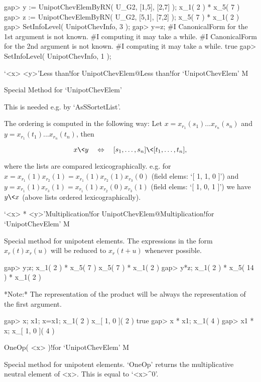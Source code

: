 \beginexample
gap> y := UnipotChevElemByRN( U_G2, [1,5], [2,7] );
x_{1}( 2 ) * x_{5}( 7 )
gap> z := UnipotChevElemByRN( U_G2, [5,1], [7,2] );
x_{5}( 7 ) * x_{1}( 2 )
gap> SetInfoLevel( UnipotChevInfo, 3 );
gap> y=z;
#I  CanonicalForm for the 1st argument is not known.
#I                    computing it may take a while.
#I  CanonicalForm for the 2nd argument is not known.
#I                    computing it may take a while.
true
gap> SetInfoLevel( UnipotChevInfo, 1 );
\endexample

\>`<x> \< <y>'{Less than!for UnipotChevElem}@{Less than!for `UnipotChevElem'} M
\indextt{\\\<}

Special Method for `UnipotChevElem'

This is needed e.g. by `AsSSortetList'.

The ordering is computed in the following way:
Let    $x = x_{r_1}(s_1) ... x_{r_n}(s_n)$
and    $y = x_{r_1}(t_1) ... x_{r_n}(t_n)$, then

$$ x \< y \quad  \Leftrightarrow \quad [ s_1, \dots, s_n ] \< [ t_1, \dots, t_n ], $$

where the lists are compared lexicographically.
e.g. for $x = x_{r_1}(1)x_{r_2}(1) = x_{r_1}(1)x_{r_2}(1)x_{r_3}(0)$  (field elems: `[ 1, 1, 0 ]')
     and $y = x_{r_1}(1)x_{r_3}(1) = x_{r_1}(1)x_{r_2}(0)x_{r_3}(1)$  (field elems: `[ 1, 0, 1 ]')
we have $y \< x$ (above lists ordered lexicographically).

\>`<x> * <y>'{Multiplication!for UnipotChevElem}@{Multiplication!for `UnipotChevElem'} M
\indextt{\\\*}

Special  method  for unipotent  elements.  The  expressions  in the  form
$x_r(t)x_r(u)$ will be reduced to $x_r(t+u)$ whenever possible.

\beginexample
gap> y;z;
x_{1}( 2 ) * x_{5}( 7 )
x_{5}( 7 ) * x_{1}( 2 )
gap> y*z;
x_{1}( 2 ) * x_{5}( 14 ) * x_{1}( 2 )
\endexample

*Note:*  The   representation  of  the   product  will   be  always   the
representation of the first argument.

\beginexample
gap> x; x1; x=x1;
x_{1}( 2 )
x_{[ 1, 0 ]}( 2 )
true
gap> x * x1;
x_{1}( 4 )
gap> x1 * x;
x_{[ 1, 0 ]}( 4 )
\endexample

\>OneOp( <x> )!{for `UnipotChevElem'} M

Special method for unipotent elements. `OneOp' returns the multiplicative
neutral element of <x>. This is equal to `<x>^0'.


